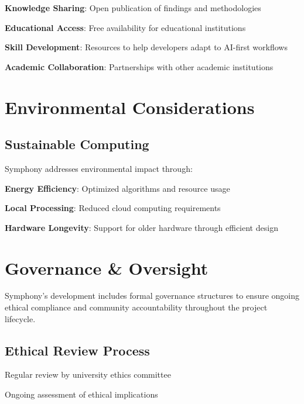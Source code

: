 \begin{compactlist}
    \item \textbf{Knowledge Sharing}: Open publication of findings and methodologies
    \item \textbf{Educational Access}: Free availability for educational institutions
    \item \textbf{Skill Development}: Resources to help developers adapt to AI-first workflows
    \item \textbf{Academic Collaboration}: Partnerships with other academic institutions
\end{compactlist}

\section*{Environmental Considerations}

\subsection*{Sustainable Computing}
Symphony addresses environmental impact through:

\begin{compactlist}
    \item \textbf{Energy Efficiency}: Optimized algorithms and resource usage
    \item \textbf{Local Processing}: Reduced cloud computing requirements
    \item \textbf{Hardware Longevity}: Support for older hardware through efficient design
\end{compactlist}

\section*{Governance \& Oversight}

\begin{successbox}
Symphony's development includes formal governance structures to ensure ongoing ethical compliance and community accountability throughout the project lifecycle.
\end{successbox}

\subsection*{Ethical Review Process}
\begin{description}[leftmargin=3cm,labelwidth=2.5cm]
    \item[\textbf{Ethics Board}] Regular review by university ethics committee
    \item[\textbf{Continuous Monitoring}] Ongoing assessment of ethical implications
\end{description}


